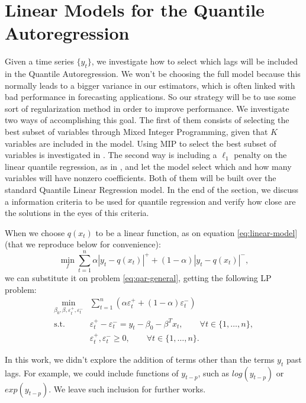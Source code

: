 \section{Linear Models for the Quantile Autoregression}
\label{sec:linear-models}

Given a time series $\{y_t\}$, we investigate how to select which lags will be included in the Quantile Autoregression. We won't be choosing the full model because this normally leads to a bigger variance in our estimators, which is often linked with bad performance in forecasting applications. So our strategy will be to use some sort of regularization method in order to improve performance.
We investigate two ways of accomplishing this goal.
The first of them consists of selecting the best subset of variables through Mixed Integer Programming, given that $K$ variables are included in the model. Using MIP to select the best subset of variables is investigated in \cite{bertsimas2015best}. The second way is including a $\ell_1$ penalty on the linear quantile regression, as in \cite{kim2009ell_1}, and let the model select which and how many variables will have nonzero coefficients. 
Both of them will be built over the standard Quantile Linear Regression model. In the end of the section, we discuss a information criteria to be used for quantile regression and verify how close are the solutions in the eyes of this criteria.

When we choose $q(x_t)$ to be a linear function, as on equation \ref{eq:linear-model} (that we reproduce below for convenience):
\begin{equation}
\min_{f}\sum_{t=1}^{n}\alpha|y_{t}-q(x_t)|^{+}+(1-\alpha)|y_{t}-q(x_t)|^{-},
\end{equation}
we can substitute it on problem \ref{eq:qar-general}, getting the following LP problem:
\begin{equation}
\begin{aligned}\min_{\beta_0,\beta,\varepsilon_{t}^{+},\varepsilon_{t}^{-}} & \sum_{t=1}^{n}\left(\alpha\varepsilon_{t}^{+}+(1-\alpha)\varepsilon_{t}^{-}\right)\\
\mbox{s.t. } & \varepsilon_{t}^{+}-\varepsilon_{t}^{-}=y_{t} - \beta_0 - \beta^T x_{t},\qquad\forall t\in\{1,\dots,n\},\\
& \varepsilon_t^+,\varepsilon_t^- \geq 0, \qquad \forall t \in \{1,\dots,n\}.
\end{aligned}
\label{eq:qar-lp}
\end{equation}

In this work, we didn't explore the addition of terms other than the terms $y_t$ past lags. For example, we could include functions of $y_{t-p}$, such as $log(y_{t-p})$ or $exp(y_{t-p})$. We leave such inclusion for further works. 

